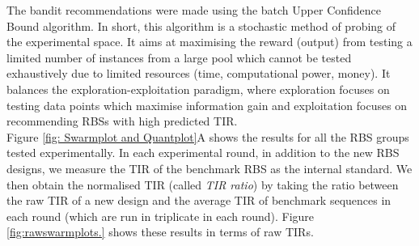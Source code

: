 \documentclass{article}
\begin{document}
The bandit recommendations were made using the batch Upper Confidence Bound algorithm.
In short, this algorithm is a stochastic method of probing of the experimental space.
It aims at maximising the reward (output) from testing a limited number of instances from a large pool which cannot be tested exhaustively due to limited resources (time, computational power, money).
It balances the exploration-exploitation paradigm, where exploration focuses on testing data points which maximise information gain and exploitation focuses on recommending RBSs with high predicted TIR.\\

Figure \ref{fig: Swarmplot and Quantplot}A shows the results for all the RBS groups tested experimentally.
In each experimental round, in addition to the new RBS designs, we measure the TIR of the benchmark RBS as the internal standard.
We then obtain the normalised TIR (called \textit{TIR ratio}) by taking the ratio between the raw TIR of a new design and the average TIR of benchmark sequences in each round (which are run in triplicate in each round).
Figure \ref{fig:rawswarmplots.} shows these results in terms of raw TIRs.\\
\end{document}
